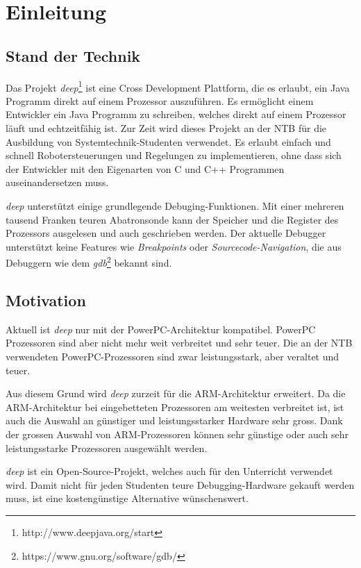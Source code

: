 \chapter{Einleitung}


\section{Stand der Technik}
Das Projekt \textit{deep}\footnote{http://www.deepjava.org/start} ist eine Cross Development Plattform, die es erlaubt, ein Java Programm direkt auf einem Prozessor auszuführen.
Es ermöglicht einem Entwickler ein Java Programm zu schreiben, welches direkt auf einem Prozessor läuft und echtzeitfähig ist.
Zur Zeit wird dieses Projekt an der NTB für die Ausbildung von Systemtechnik-Studenten verwendet.
Es erlaubt einfach und schnell Robotersteuerungen und Regelungen zu implementieren, ohne dass sich der Entwickler mit den Eigenarten von C und C++ Programmen auseinandersetzen muss.

\textit{deep} unterstützt einige grundlegende Debuging-Funktionen.
Mit einer mehreren tausend Franken teuren Abatronsonde kann der Speicher und die Register des Prozessors ausgelesen und auch geschrieben werden.
Der aktuelle Debugger unterstützt keine Features wie \textit{Breakpoints} oder \textit{Sourcecode-Navigation}, die aus Debuggern wie dem \textit{gdb}\footnote{https://www.gnu.org/software/gdb/} bekannt sind.



\section{Motivation}
Aktuell ist \textit{deep} nur mit der PowerPC-Architektur kompatibel.
PowerPC Prozessoren sind aber nicht mehr weit verbreitet und sehr teuer.
Die an der NTB verwendeten PowerPC-Prozessoren sind zwar leistungsstark, aber veraltet und teuer.

Aus diesem Grund wird \textit{deep} zurzeit für die ARM-Architektur erweitert.
Da die ARM-Architektur bei eingebetteten Prozessoren am weitesten verbreitet ist, ist auch die Auswahl an günstiger und leistungsstarker Hardware sehr gross.
Dank der grossen Auswahl von ARM-Prozessoren können sehr günstige oder auch sehr leistungsstarke Prozessoren ausgewählt werden.

\textit{deep} ist ein Open-Source-Projekt, welches auch für den Unterricht verwendet wird.
Damit nicht für jeden Studenten teure Debugging-Hardware gekauft werden muss, ist eine kostengünstige Alternative wünschenswert.

